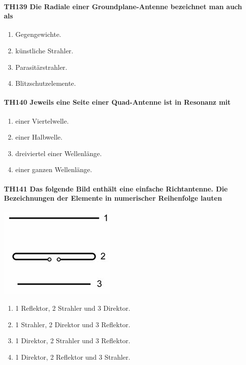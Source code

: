 \documentclass[8pt]{article}
\begin{document}
\paragraph*{TH139 Die Radiale einer Groundplane-Antenne bezeichnet man auch als} 
\begin{enumerate}[nolistsep,label=\Alph*]
\item Gegengewichte.
\item künstliche Strahler.
\item Parasitärstrahler.
\item Blitzschutzelemente.
\end{enumerate}

\paragraph*{TH140 Jeweils eine Seite einer Quad-Antenne ist in Resonanz mit} 
\begin{enumerate}[nolistsep,label=\Alph*]
\item einer Viertelwelle.
\item einer Halbwelle.
\item dreiviertel einer Wellenlänge.
\item einer ganzen Wellenlänge.
\end{enumerate}

\paragraph*{TH141 Das folgende Bild enthält eine einfache Richtantenne. Die Bezeichnungen der Elemente in numerischer Reihenfolge lauten}
\begin{center}
	\begin{minipage}{\linewidth}
		\centering
		\includegraphics[scale=1.0]{pics/th141_a.jpg}
	\end{minipage}
\end{center}
\begin{enumerate}[nolistsep,label=\Alph*]
\item 1 Reflektor, 2 Strahler und 3 Direktor.
\item 1 Strahler, 2 Direktor und 3 Reflektor.
\item 1 Direktor, 2 Strahler und 3 Reflektor.
\item 1 Direktor, 2 Reflektor und 3 Strahler.
\end{enumerate}
\end{document}
